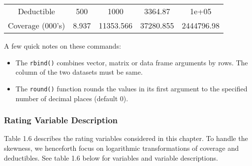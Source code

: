 \documentclass[]{book}
\theoremstyle{definition}
\theoremstyle{definition}
\theoremstyle{definition}
\theoremstyle{remark}
\begin{document}
\begin{longtable}[]{@{}ccccc@{}}
\begin{minipage}[t]{0.23\columnwidth}
Deductible\strut
\end{minipage} & \begin{minipage}[t]{0.12\columnwidth}\centering\strut
500\strut
\end{minipage} & \begin{minipage}[t]{0.14\columnwidth}\centering\strut
1000\strut
\end{minipage} & \begin{minipage}[t]{0.14\columnwidth}\centering\strut
3364.87\strut
\end{minipage} & \begin{minipage}[t]{0.16\columnwidth}\centering\strut
1e+05\strut
\end{minipage}\tabularnewline
\begin{minipage}[t]{0.23\columnwidth}\centering\strut
Coverage (000's)\strut
\end{minipage} & \begin{minipage}[t]{0.12\columnwidth}\centering\strut
8.937\strut
\end{minipage} & \begin{minipage}[t]{0.14\columnwidth}\centering\strut
11353.566\strut
\end{minipage} & \begin{minipage}[t]{0.14\columnwidth}\centering\strut
37280.855\strut
\end{minipage} & \begin{minipage}[t]{0.16\columnwidth}\centering\strut
2444796.98\strut
\end{minipage}\tabularnewline
\bottomrule
\end{longtable}

A few quick notes on these commands:

\begin{itemize}
\item
  The \texttt{rbind()} combines vector, matrix or data frame arguments
  by rows. The column of the two datasets must be same.
\item
  The \texttt{round()} function rounds the values in its first argument
  to the specified number of decimal places (default 0).
\end{itemize}

\subsubsection{Rating Variable
Description}\label{rating-variable-description}

Table 1.6 describes the rating variables considered in this chapter. To
handle the skewness, we henceforth focus on logarithmic transformations
of coverage and deductibles. See table 1.6 below for variables and
variable descriptions.
\end{document}
